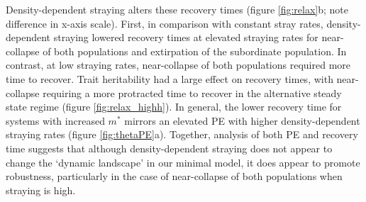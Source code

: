 \documentclass{revtex4}
\begin{document}
Density-dependent straying alters these recovery times (figure \ref{fig:relax}b; note difference in x-axis scale). 
First, in comparison with constant stray rates, density-dependent straying lowered recovery times at elevated straying rates for near-collapse of both populations and extirpation of the subordinate population.
In contrast, at low straying rates, near-collapse of both populations required more time to recover. %
Trait heritability had a large effect on recovery times, with near-collapse requiring a more protracted time to recover in the alternative steady state regime (figure \ref{fig:relax_highh}).
In general, the lower recovery time for systems with increased $m^*$ mirrors an elevated PE with higher density-dependent straying rates (figure \ref{fig:thetaPE}a).
Together, analysis of both PE and recovery time suggests that although density-dependent straying does not appear to change the `dynamic landscape' in our minimal model, it does appear to promote robustness, particularly in the case of near-collapse of both populations when straying is high.
\\
\end{document}
